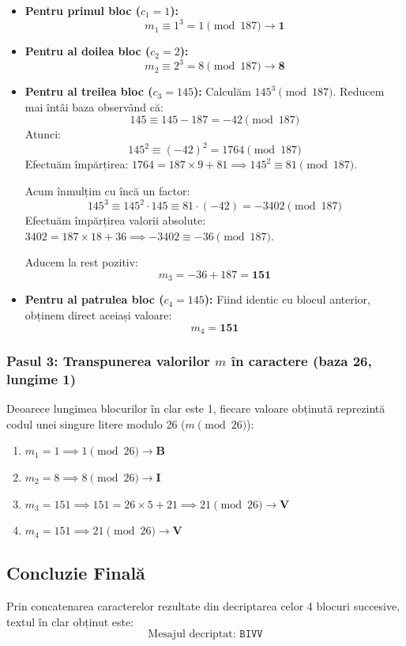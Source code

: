 \documentclass[12pt]{article}
\begin{document}
\begin{itemize}
    \item \textbf{Pentru primul bloc ($c_1 = 1$):}
    \[ m_1 \equiv 1^3 = 1 \pmod{187} \rightarrow \mathbf{1} \]
    
    \item \textbf{Pentru al doilea bloc ($c_2 = 2$):}
    \[ m_2 \equiv 2^3 = 8 \pmod{187} \rightarrow \mathbf{8} \]
    
    \item \textbf{Pentru al treilea bloc ($c_3 = 145$):}
    Calculăm $145^3 \pmod{187}$. Reducem mai întâi baza observând că:
    \[ 145 \equiv 145 - 187 = -42 \pmod{187} \]
    Atunci:
    \[ 145^2 \equiv (-42)^2 = 1764 \pmod{187} \]
    Efectuăm împărțirea: $1764 = 187 \times 9 + 81 \implies 145^2 \equiv 81 \pmod{187}$.
    
    Acum înmulțim cu încă un factor:
    \[ 145^3 \equiv 145^2 \cdot 145 \equiv 81 \cdot (-42) = -3402 \pmod{187} \]
    Efectuăm împărțirea valorii absolute: $3402 = 187 \times 18 + 36 \implies -3402 \equiv -36 \pmod{187}$.
    
    Aducem la rest pozitiv:
    \[ m_3 = -36 + 187 = \mathbf{151} \]
    
    \item \textbf{Pentru al patrulea bloc ($c_4 = 145$):}
    Fiind identic cu blocul anterior, obținem direct aceiași valoare:
    \[ m_4 = \mathbf{151} \]
\end{itemize}

\subsubsection*{Pasul 3: Transpunerea valorilor $m$ în caractere (baza 26, lungime 1)}
Deoarece lungimea blocurilor în clar este 1, fiecare valoare obținută reprezintă codul unei singure litere modulo 26 ($m \pmod{26}$):
\begin{enumerate}
    \item $m_1 = 1 \implies 1 \pmod{26} \rightarrow \mathbf{B}$
    \item $m_2 = 8 \implies 8 \pmod{26} \rightarrow \mathbf{I}$
    \item $m_3 = 151 \implies 151 = 26 \times 5 + 21 \implies 21 \pmod{26} \rightarrow \mathbf{V}$
    \item $m_4 = 151 \implies 21 \pmod{26} \rightarrow \mathbf{V}$
\end{enumerate}

\subsection*{Concluzie Finală}
Prin concatenarea caracterelor rezultate din decriptarea celor 4 blocuri succesive, textul în clar obținut este:
\[
\text{Mesajul decriptat: } \mathbf{\texttt{BIVV}}
\]
\end{document}
